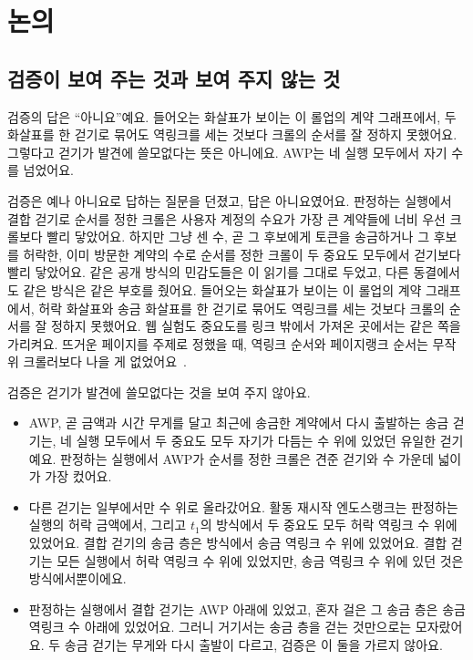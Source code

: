 \section{논의}

\subsection{검증이 보여 주는 것과 보여 주지 않는 것}

\begin{yoji}
검증의 답은 “아니요”예요. 들어오는 화살표가 보이는 이 롤업의 계약 그래프에서, 두 화살표를 한 걷기로 묶어도 역링크를 세는 것보다 크롤의 순서를 잘 정하지 못했어요. 그렇다고 걷기가 발견에 쓸모없다는 뜻은 아니에요. AWP는 네 실행 모두에서 자기 수를 넘었어요.
\end{yoji}

검증은 예나 아니요로 답하는 질문을 던졌고, 답은 아니요였어요. 판정하는 실행에서 결합 걷기로 순서를 정한 크롤은 사용자 계정의 수요가 가장 큰 계약들에 너비 우선 크롤보다 빨리 닿았어요. 하지만 그냥 센 수, 곧 그 후보에게 토큰을 송금하거나 그 후보를 허락한, 이미 방문한 계약의 수로 순서를 정한 크롤이 두 중요도 모두에서 걷기보다 빨리 닿았어요. 같은 공개 방식의 민감도들은 이 읽기를 그대로 두었고, 다른 동결에서도 같은 방식은 같은 부호를 줬어요. 들어오는 화살표가 보이는 이 롤업의 계약 그래프에서, 허락 화살표와 송금 화살표를 한 걷기로 묶어도 역링크를 세는 것보다 크롤의 순서를 잘 정하지 못했어요. 웹 실험도 중요도를 링크 밖에서 가져온 곳에서는 같은 쪽을 가리켜요. 뜨거운 페이지를 주제로 정했을 때, 역링크 순서와 페이지랭크 순서는 무작위 크롤러보다 나을 게 없었어요~\cite{cho1998crawling}.

검증은 걷기가 발견에 쓸모없다는 것을 보여 주지 않아요.
\begin{itemize}
\item AWP, 곧 금액과 시간 무게를 달고 최근에 송금한 계약에서 다시 출발하는 송금 걷기는, 네 실행 모두에서 두 중요도 모두 자기가 다듬는 수 위에 있었던 유일한 걷기예요. 판정하는 실행에서 AWP가 순서를 정한 크롤은 견준 걷기와 수 가운데 넓이가 가장 컸어요.
\item 다른 걷기는 일부에서만 수 위로 올라갔어요. 활동 재시작 엔도스랭크는 판정하는 실행의 허락 금액에서, 그리고 $t_1$의 \both{} 방식에서 두 중요도 모두 허락 역링크 수 위에 있었어요. 결합 걷기의 송금 층은 \outm{} 방식에서 송금 역링크 수 위에 있었어요. 결합 걷기는 모든 실행에서 허락 역링크 수 위에 있었지만, 송금 역링크 수 위에 있던 것은 \outm{} 방식에서뿐이에요.
\item 판정하는 실행에서 결합 걷기는 AWP 아래에 있었고, 혼자 걸은 그 송금 층은 송금 역링크 수 아래에 있었어요. 그러니 거기서는 송금 층을 걷는 것만으로는 모자랐어요. 두 송금 걷기는 무게와 다시 출발이 다르고, 검증은 이 둘을 가르지 않아요.
\end{itemize}

